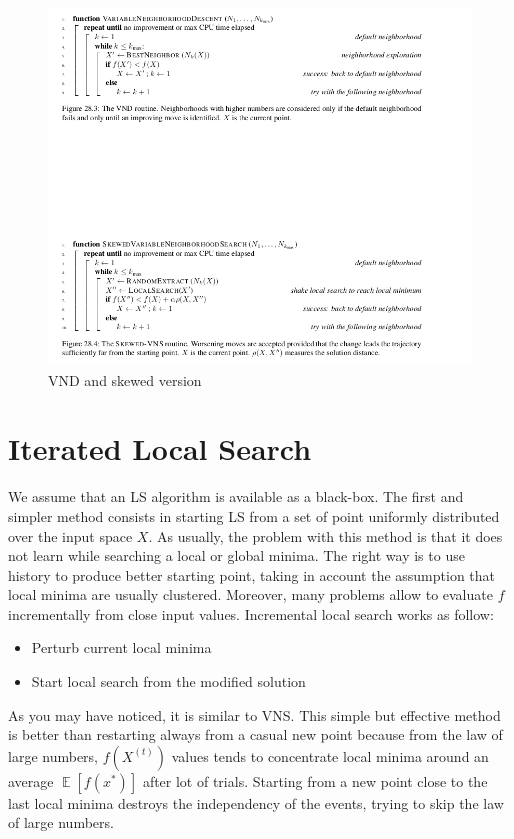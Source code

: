 \documentclass[11pt]{article}
\DeclareMathOperator{\E}{\mathbb{E}}
\begin{document}
\begin{figure}[H]
\includegraphics[scale=0.50]{vns}
\caption{VND and skewed version}
\centering
\end{figure}

\section{Iterated Local Search}
We assume that an LS algorithm is available as a black-box. The first and simpler method consists in starting LS from a set of point uniformly distributed over the input space $X$. As usually, the problem with this method is that it does not learn while searching a local or global minima. The right way is to use history to produce better starting point, taking in account the assumption that local minima are usually clustered. Moreover, many problems allow to evaluate $f$ incrementally from close input values.
Incremental local search works as follow:
\begin{itemize}
\item{Perturb current local minima}
\item{Start local search from the modified solution}
\end{itemize}
As you may have noticed, it is similar to VNS. This simple but effective method is better than restarting always from a casual new point because from the law of large numbers, $f(X^{(t)})$ values tends to concentrate local minima around an average $\E[f(x^*)]$ after lot of trials. Starting from a new point close to the last local minima destroys the independency of the events, trying to skip the law of large numbers.
\end{document}
